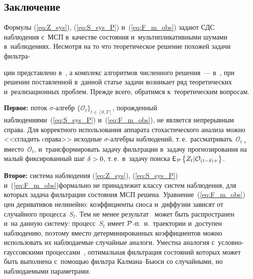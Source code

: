 \begin{multicols}{2}
\vspace*{-6pt}

 \section{Заключение}
 
 \vspace*{-2pt}
 
Формулы (\ref{eq:Z_sys}), (\ref{eq:S_sys_P}) и~(\ref{eq:F_m_obs}) задают СДС наблюдения 
с~МСП в~качестве состояния и~мультипликативными шумами в~наблюдениях. Несмотря на то что теоретическое решение похожей задачи фильтра-\linebreak\vspace*{-12pt}

\pagebreak

\noindent
ции представлено 
в~\cite{BS_20}, а комплекс алгоритмов численного решения~--- в~\cite{B_20_2_ARC_, B_20_2_ARC}, при решении поставленной в~данной статье задачи возникает
 ряд теоретических и~реализационных проб\-лем. Прежде всего, обратимся к~теоретическим вопросам.

\textbf{Первое:} поток $\sigma$-ал\-гебр $\{\mathcal{O}_t\}_{t \in [0,T]}$, порожденный наблюдениями~(\ref{eq:S_sys_P}) и~(\ref{eq:F_m_obs}), 
не является непрерывным справа. Для корректного использования аппарата стохастического анализа можно <<сгладить cправа>> исходные
 $\sigma$-ал\-геб\-ры наблюдений, т.\,е.\ рас\-смат\-ри\-вать~$\mathcal{O}_{t+}$ вмес\-то~$\mathcal{O}_t$, 
 и~трансформировать задачу фильтрации в~задачу прогнозирования на малый фиксированный шаг $\delta\hm>0$, т.\,е.\ 
 в~задачу поиска $\mathsf{E}_{ {\mathcal P} }\left\{ \mathop{Z_t|\mathcal{O}_{(t-\delta)+}} \right\}$.

\textbf{Второе:} система наблюдения (\ref{eq:Z_sys}), (\ref{eq:S_sys_P}) и~(\ref{eq:F_m_obs})\linebreak формально не принадлежит классу систем наблюдения, 
для которых задача фильтрации состояния МСП решена. Уравнение~(\ref{eq:F_m_obs}) цен деривативов нелинейно: коэффициенты сноса 
и~диффузии зависят от случайного процесса~$S_t$. Тем не менее результат~\cite{BS_20} может быть распространен и~на данную систему: процесс~$S_t$ имеет 
${\mathcal P}$-п.~н.\ траектории и~доступен наблюдению, поэтому вместо детерминированных коэффициентов можно использовать их наблюдаемые случайные аналоги. 
Уместна аналогия с~услов\-но-гаус\-сов\-ски\-ми процессами~\cite{LSh_74}, оптимальная фильт\-ра\-ция со\-сто\-яний 
которых может быть выполнена с~помощью фильтра Кал\-ма\-на--Бью\-си со случайными, но наблюдаемыми па\-ра\-мет\-рами.


\end{multicols}
